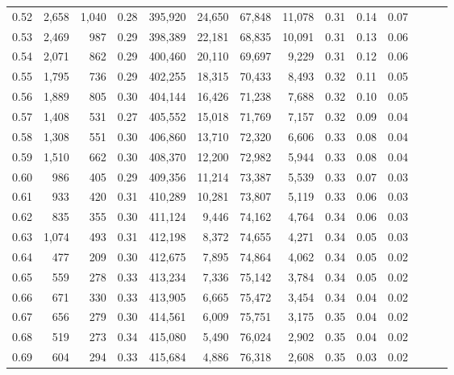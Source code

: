 \begin{tabular}{rrrrrrrrrrrrrr}
0.52 &   2,658 &  1,040 &  0.28 &  395,920 &   24,650 &  67,848 &  11,078 &  0.31 &  0.14 &      0.07 \\
0.53 &   2,469 &    987 &  0.29 &  398,389 &   22,181 &  68,835 &  10,091 &  0.31 &  0.13 &      0.06 \\
0.54 &   2,071 &    862 &  0.29 &  400,460 &   20,110 &  69,697 &   9,229 &  0.31 &  0.12 &      0.06 \\
0.55 &   1,795 &    736 &  0.29 &  402,255 &   18,315 &  70,433 &   8,493 &  0.32 &  0.11 &      0.05 \\
0.56 &   1,889 &    805 &  0.30 &  404,144 &   16,426 &  71,238 &   7,688 &  0.32 &  0.10 &      0.05 \\
0.57 &   1,408 &    531 &  0.27 &  405,552 &   15,018 &  71,769 &   7,157 &  0.32 &  0.09 &      0.04 \\
0.58 &   1,308 &    551 &  0.30 &  406,860 &   13,710 &  72,320 &   6,606 &  0.33 &  0.08 &      0.04 \\
0.59 &   1,510 &    662 &  0.30 &  408,370 &   12,200 &  72,982 &   5,944 &  0.33 &  0.08 &      0.04 \\
0.60 &     986 &    405 &  0.29 &  409,356 &   11,214 &  73,387 &   5,539 &  0.33 &  0.07 &      0.03 \\
0.61 &     933 &    420 &  0.31 &  410,289 &   10,281 &  73,807 &   5,119 &  0.33 &  0.06 &      0.03 \\
0.62 &     835 &    355 &  0.30 &  411,124 &    9,446 &  74,162 &   4,764 &  0.34 &  0.06 &      0.03 \\
0.63 &   1,074 &    493 &  0.31 &  412,198 &    8,372 &  74,655 &   4,271 &  0.34 &  0.05 &      0.03 \\
0.64 &     477 &    209 &  0.30 &  412,675 &    7,895 &  74,864 &   4,062 &  0.34 &  0.05 &      0.02 \\
0.65 &     559 &    278 &  0.33 &  413,234 &    7,336 &  75,142 &   3,784 &  0.34 &  0.05 &      0.02 \\
0.66 &     671 &    330 &  0.33 &  413,905 &    6,665 &  75,472 &   3,454 &  0.34 &  0.04 &      0.02 \\
0.67 &     656 &    279 &  0.30 &  414,561 &    6,009 &  75,751 &   3,175 &  0.35 &  0.04 &      0.02 \\
0.68 &     519 &    273 &  0.34 &  415,080 &    5,490 &  76,024 &   2,902 &  0.35 &  0.04 &      0.02 \\
0.69 &     604 &    294 &  0.33 &  415,684 &    4,886 &  76,318 &   2,608 &  0.35 &  0.03 &      0.02 \\

\end{tabular}

